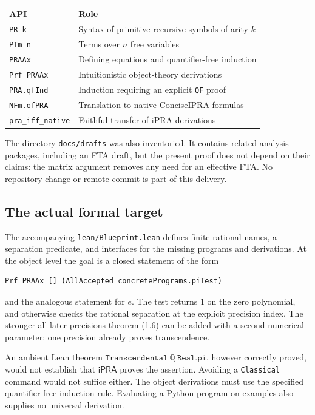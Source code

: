 \documentclass[11pt]{article}
\theoremstyle{definition}
\newcommand{\ipra}{\mathsf{iPRA}}
\newcommand{\Q}{\mathbb Q}
\begin{document}
\begin{center}\small
\begin{tabular}{@{}ll@{}}
\toprule
API & Role\\\midrule
\texttt{PR k} & Syntax of primitive recursive symbols of arity \(k\)\\
\texttt{PTm n} & Terms over \(n\) free variables\\
\texttt{PRAAx} & Defining equations and quantifier-free induction\\
\texttt{Prf PRAAx} & Intuitionistic object-theory derivations\\
\texttt{PRA.qfInd} & Induction requiring an explicit \texttt{QF} proof\\
\texttt{NFm.ofPRA} & Translation to native ConciseIPRA formulas\\
\texttt{pra\_iff\_native} & Faithful transfer of iPRA derivations\\
\bottomrule
\end{tabular}
\end{center}

The directory \texttt{docs/drafts} was also inventoried. It contains
related analysis packages, including an FTA draft, but the present proof
does not depend on their claims: the matrix argument removes any need
for an effective FTA. No repository change or remote commit is part of
this delivery.

\subsection{The actual formal target}

The accompanying \texttt{lean/Blueprint.lean} defines finite rational
names, a separation predicate, and interfaces for the missing programs
and derivations. At the object level the goal is a closed statement
of the form
\begin{lstlisting}
Prf PRAAx [] (AllAccepted concretePrograms.piTest)
\end{lstlisting}
and the analogous statement for \(e\).
The test returns \(1\) on the zero polynomial, and otherwise checks
the rational separation at the explicit precision index.
The stronger all-later-precisions theorem (1.6) can be added with a
second numerical parameter; one precision already proves transcendence.

An ambient Lean theorem
\(\texttt{Transcendental}\ \Q\ \texttt{Real.pi}\), however correctly
proved, would not establish that \(\ipra\) proves the assertion.
Avoiding a \texttt{Classical} command would not suffice either.
The object derivations must use the specified quantifier-free
induction rule. Evaluating a Python program on examples also supplies
no universal derivation.
\end{document}
